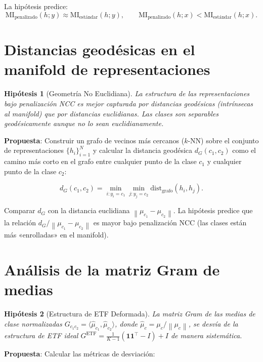 \documentclass[12pt,a4paper]{report}
\newtheorem{hypothesis}{Hipótesis}[chapter]
\newcommand{\norm}[1]{\left\lVert#1\right\rVert}
\newcommand{\inner}[2]{\langle #1, #2 \rangle}
\newcommand{\MI}{\text{MI}}
\begin{document}
La hipótesis predice:
\begin{equation}
    \MI_{\text{penalizado}}(h; y) \approx \MI_{\text{estándar}}(h; y), \qquad
    \MI_{\text{penalizado}}(h; x) < \MI_{\text{estándar}}(h; x).
\end{equation}

\section{Distancias geodésicas en el manifold de representaciones}

\begin{hypothesis}[Geometría No Euclidiana]
La estructura de las representaciones bajo penalización NCC es mejor capturada por distancias geodésicas (intrínsecas al manifold) que por distancias euclidianas. Las clases son separables geodésicamente aunque no lo sean euclidianamente.
\end{hypothesis}

\textbf{Propuesta}: Construir un grafo de vecinos más cercanos ($k$-NN) sobre el conjunto de representaciones $\{h_i\}_{i=1}^N$ y calcular la distancia geodésica $d_G(c_1, c_2)$ como el camino más corto en el grafo entre cualquier punto de la clase $c_1$ y cualquier punto de la clase $c_2$:

\begin{equation}
    d_G(c_1, c_2) = \min_{i: y_i=c_1} \min_{j: y_j=c_2} \text{dist}_{\text{grafo}}(h_i, h_j).
\end{equation}

Comparar $d_G$ con la distancia euclidiana $\norm{\mu_{c_1} - \mu_{c_2}}$. La hipótesis predice que la relación $d_G / \norm{\mu_{c_1} - \mu_{c_2}}$ es mayor bajo penalización NCC (las clases están más «enrolladas» en el manifold).

\section{Análisis de la matriz Gram de medias}

\begin{hypothesis}[Estructura de ETF Deformada]
La matriz Gram de las medias de clase normalizadas $G_{c_1 c_2} = \inner{\hat{\mu}_{c_1}}{\hat{\mu}_{c_2}}$, donde $\hat{\mu}_c = \mu_c / \norm{\mu_c}$, se desvía de la estructura de ETF ideal $G^{\text{ETF}} = \frac{1}{K-1}(\mathbf{1}\mathbf{1}^\top - I) + I$ de manera sistemática.
\end{hypothesis}

\textbf{Propuesta}: Calcular las métricas de desviación:
\end{document}
